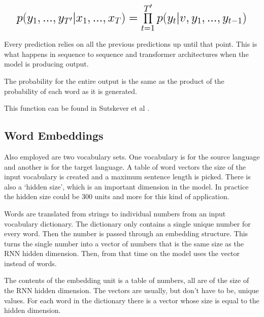 \[
\mathlarger{ \mathlarger{ \mathlarger{
			p(y_1,...,y_{T'}|x_1,...,x_T) = \prod_{t=1}^{T'} p(y_t|v,y_1,..., y_{t-1}) 
} } }
\]

Every prediction relies on all the previous predictions up until that point. This is what happens in sequence to sequence and transformer architectures when the model is producing output. 

The probability for the entire output is the same as the product of the probability of each word as it is generated. 


This function can be found in Sutskever et al \cite{DBLP:journals/corr/SutskeverVL14}.

\fi

\subsection{Word Embeddings}

Also employed are two vocabulary sets. One vocabulary is for the source language and another is for the target language. A table of word vectors the size of the input vocabulary is created and a maximum sentence length is picked. There is also a `hidden size', which is an important dimension in the model. In practice the hidden size could be 300 units and more for this kind of application.

Words are translated from strings to individual numbers from an input vocabulary dictionary. The dictionary only contains a single unique number for every word. Then the number is passed through an embedding structure. This turns the single number into a vector of numbers that is the same size as the RNN hidden dimension. Then, from that time on the model uses the vector instead of words.

The contents of the embedding unit is a table of numbers, all are of the size of the RNN hidden dimension. The vectors are usually, but don\textquoteright t have to be, unique values. For each word in the dictionary there is a vector whose size is equal to the hidden dimension.

